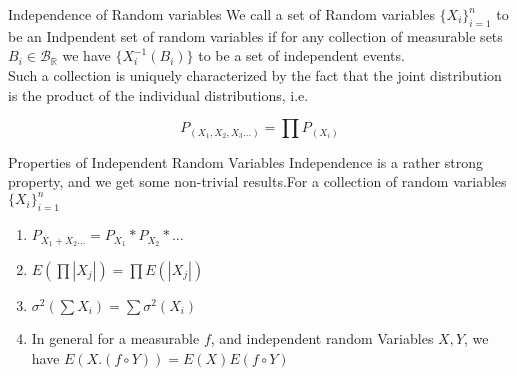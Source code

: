 \documentclass{beamer}
\begin{document}
\begin{frame}{Independence of Random variables}
    We call a set of Random variables $\{X_i\}_{i=1}^n$ to be an \textcolor{colorblue}{Indpendent set of random variables} if for any collection of measurable sets $B_i\in \mathcal B_\mathbb R$ we have $\{X_i^{-1}(B_i)\}$ to be a set of independent events.\\\pause
    Such a collection is uniquely characterized by the fact that the joint distribution is the product of the individual distributions, i.e. 
    \begin{tcolorbox}
        $$P_{(X_1,X_2,X_3\hdots)}=\prod P_{(X_i)}$$
    \end{tcolorbox}
\end{frame}
\begin{frame}{Properties of Independent Random Variables}
    Independence is a rather strong property, and we get some non-trivial results.\pause For a collection of random variables $\{X_i\}_{i=1}^n$ 
    \begin{enumerate}
         \item $P_{X_1+X_2...}=P_{X_1}*P_{X_2}*\hdots$\pause
         \item $E(\prod|X_j|)=\prod E(|X_j|)$\pause
         \item $\sigma^2(\sum X_i)=\sum\sigma^2(X_i)$\pause
         \item In general for a measurable $f$, and independent random Variables $X,Y$, we have $E(X.(f\circ Y))=E(X)E(f\circ Y)$\pause
    \end{enumerate}
\end{frame}
\end{document}
